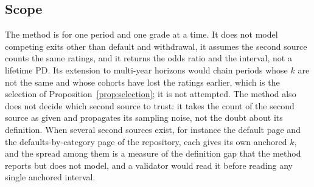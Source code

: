 \subsection{Scope}

The method is for one period and one grade at a time. It does not model competing exits other than default and withdrawal, it assumes the second source counts the same ratings, and it returns the odds ratio and the interval, not a lifetime PD. Its extension to multi-year horizons would chain periods whose $k$ are not the same and whose cohorts have lost the ratings \wdn{} earlier, which is the selection of Proposition~\ref{prop:selection}; it is not attempted. The method also does not decide which second source to trust: it takes the count of the second source as given and propagates its sampling noise, not the doubt about its definition. When several second sources exist, for instance the default page and the defaults-by-category page of the repository, each gives its own anchored $k$, and the spread among them is a measure of the definition gap that the method reports but does not model, and a validator would read it before reading any single anchored interval.
